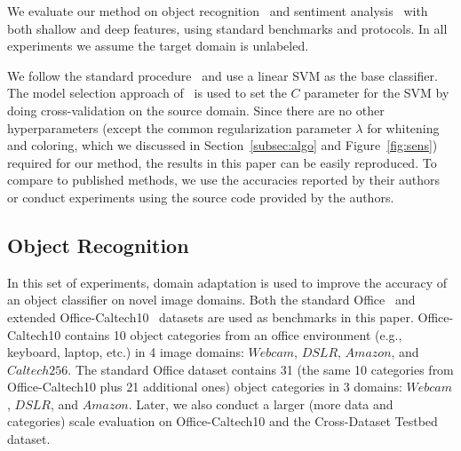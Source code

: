 \documentclass[letterpaper]{article}
\begin{document}
We evaluate our method on object recognition~\cite{saenko2010adapting} and sentiment analysis~\cite{Blitzer07Biographies} with both shallow and deep features, using standard benchmarks and protocols. In all experiments we assume the target domain is unlabeled. 

We follow the standard procedure~\cite{sasb,decaf} and use a linear SVM as the base classifier. The model selection approach of~\cite{sasb} is used to set the $C$ parameter for the SVM by doing cross-validation on the source domain. Since there are no other hyperparameters (except the common regularization parameter $\lambda$ for whitening and coloring, which we discussed in Section~\ref{subsec:algo} and Figure~\ref{fig:sens}) required for our method, the results in this paper can be easily reproduced. To compare to published methods, we use the accuracies reported by their authors or conduct experiments using the source code provided by the authors. 

\subsection{Object Recognition}
\label{subsec:recog}
In this set of experiments, domain adaptation is used to improve the accuracy of an object classifier on novel image domains.
Both the standard Office~\cite{saenko2010adapting} and extended Office-Caltech10~\cite{gfk} datasets are used as benchmarks in this paper. Office-Caltech10 contains 10 object categories from an office environment (e.g., keyboard, laptop, etc.) in 4 image domains: $Webcam$, $DSLR$, $Amazon$, and $Caltech256$. The standard Office dataset contains 31 (the same 10 categories from Office-Caltech10 plus 21 additional ones) object categories in 3 domains: $Webcam$, $DSLR$, and $Amazon$. Later, we also conduct a larger (more data and categories) scale evaluation on Office-Caltech10 and the Cross-Dataset Testbed~\cite{cross_dataset} dataset. 
\end{document}
